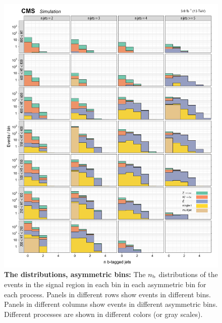 \begin{figure}[!h]
\centering
\includegraphics[scale=0.95]{figures/kiplots/c150107_s150318_f015_nbjets_40}
\caption{\textbf{\boldmath The \nb distributions, asymmetric \njet bins:}
The $n_{\text{b}}$ distributions of the events in the signal region in each
\scalht bin in each asymmetric \njet bin for each process. Panels in
different rows show events in different \scalht bins. Panels in
different columns show events in different asymmetric \njet bins.
Different processes are shown in different colors (or gray scales).}
\label{c150107_s150318_f015_nbjets_40}
\end{figure}


